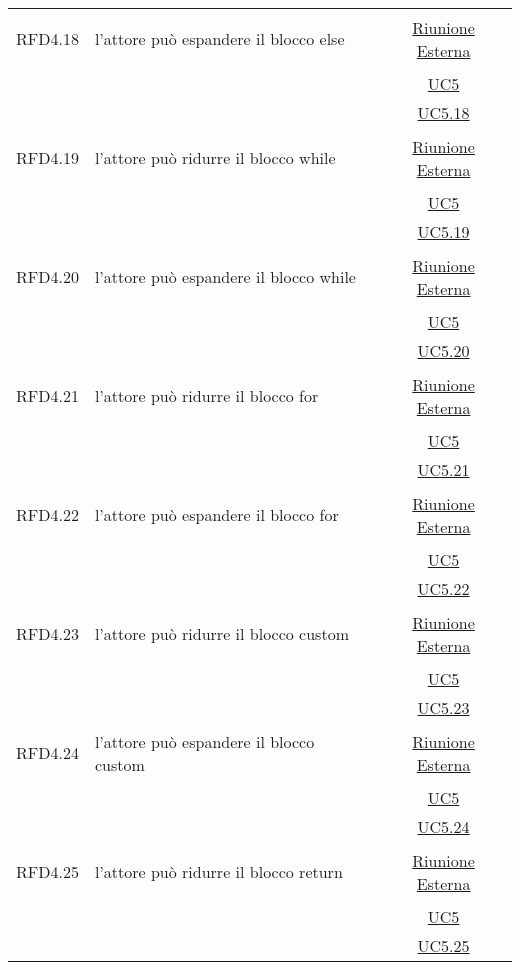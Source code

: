 \begin{longtable}{|c|>{\centering}m{7cm}|c|}
\hypertarget{RFD4.18}{RFD4.18} & l'attore può espandere il blocco else &  \hyperlink{Riunione Esterna}{Riunione Esterna}\\
& &\hyperref[UC5]{UC5}\\
& &\hyperref[UC5.18]{UC5.18}\\ \hline

\hypertarget{RFD4.19}{RFD4.19} & l'attore può ridurre il blocco while & \hyperlink{Riunione Esterna}{Riunione Esterna}\\
& &\hyperref[UC5]{UC5}\\
& & \hyperref[UC5.19]{UC5.19}\\ \hline

\hypertarget{RFD4.20}{RFD4.20} & l'attore può espandere il blocco while &  \hyperlink{Riunione Esterna}{Riunione Esterna}\\
& &\hyperref[UC5]{UC5}\\
& &\hyperref[UC5.20]{UC5.20}\\ \hline

\hypertarget{RFD4.21}{RFD4.21} & l'attore può ridurre il blocco for & \hyperlink{Riunione Esterna}{Riunione Esterna}\\
& &\hyperref[UC5]{UC5}\\
& & \hyperref[UC5.21]{UC5.21}\\ \hline

\hypertarget{RFD4.22}{RFD4.22} & l'attore può espandere il blocco for &  \hyperlink{Riunione Esterna}{Riunione Esterna}\\
& &\hyperref[UC5]{UC5}\\
& &\hyperref[UC5.22]{UC5.22}\\ \hline

\hypertarget{RFD4.23}{RFD4.23} & l'attore può ridurre il blocco custom & \hyperlink{Riunione Esterna}{Riunione Esterna}\\
& &\hyperref[UC5]{UC5}\\
& & \hyperref[UC5.23]{UC5.23}\\ \hline

\hypertarget{RFD4.24}{RFD4.24} & l'attore può espandere il blocco custom &  \hyperlink{Riunione Esterna}{Riunione Esterna}\\
& &\hyperref[UC5]{UC5}\\
& &\hyperref[UC5.24]{UC5.24}\\ \hline

\hypertarget{RFD4.25}{RFD4.25} & l'attore può ridurre il blocco return & \hyperlink{Riunione Esterna}{Riunione Esterna}\\
& &\hyperref[UC5]{UC5}\\
& & \hyperref[UC5.25]{UC5.25}\\ \hline


\end{longtable}
